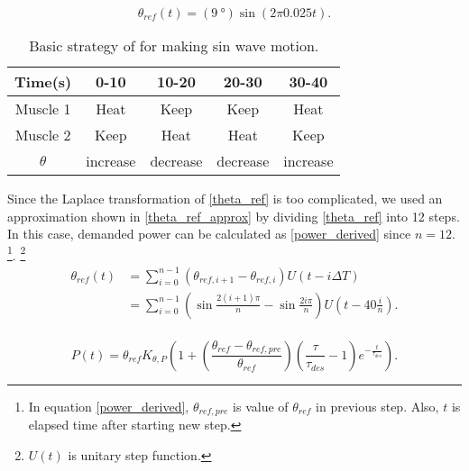 


\begin{equation}\label{theta_ref}
\theta_{ref}(t)=(\SI{9}{\degree})\sin(2\pi 0.025t).
\end{equation}

\begin{table}[b]
	\caption{Basic strategy of \apc for making sin wave motion.}
	\label{table_apc_basic}
	\begin{center}
		\begin{tabular}{c||c|c|c|c}
			\hline
			Time(s) & 0-10 & 10-20 & 20-30 & 30-40 \\
			\hline
			Muscle 1 & Heat & Keep & Keep & Heat \\
			Muscle 2 & Keep & Heat & Heat & Keep \\
			\hline
			$\theta$ & increase & decrease & decrease & increase \\
			\hline
		\end{tabular}
	\end{center}
\end{table}

Since the Laplace transformation of \eqref{theta_ref} is too complicated, we used an approximation shown in \eqref{theta_ref_approx} by dividing \eqref{theta_ref} into 12 steps. In this case, demanded power can be calculated as \eqref{power_derived} since $n=12$.
\footnote{In equation \eqref{power_derived}, $\theta_{ref,pre}$ is value of $\theta_{ref}$ in previous step. Also, $t$ is elapsed time after starting new step.}. 
\footnote{$U(t)$ is unitary step function.}
\begin{equation} \label{theta_ref_approx}
\begin{aligned} 
\theta_{ref}(t) & = \sum_{i=0}^{n-1}{(\theta_{ref,i+1}-\theta_{ref,i})U(t-i\Delta T)} \\
& = \sum_{i=0}^{n-1}{\left(\sin{\frac{2(i+1)\pi}{n}}-\sin{\frac{2i\pi}{n}}\right)U\left(t-40\frac{i}{n}\right)}. \\
\end{aligned}
\end{equation}

\begin{equation} \label{power_derived}
P(t)=\theta_{ref}K_{\theta,P}\left(1+\left(\frac{\theta_{ref}-\theta_{ref,pre}}{\theta_{ref}}\right)\left(\frac{\tau}{\tau_{des}}-1\right)e^{-\frac{t}{\tau_{des}}}\right).
\end{equation}

